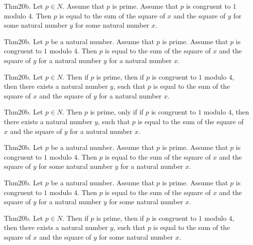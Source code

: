 \documentclass{article}
\begin{document}
Thm20b. Let $p \in N$. Assume that $p$ is prime. Assume that $p$ is congruent to $1$ modulo $4$. Then $p$ is equal to the sum of the square of $x$ and the square of $y$ for some natural number $y$ for some natural number $x$.

Thm20b. Let $p$ be a natural number. Assume that $p$ is prime. Assume that $p$ is congruent to $1$ modulo $4$. Then $p$ is equal to the sum of the square of $x$ and the square of $y$ for a natural number $y$ for a natural number $x$.

Thm20b. Let $p \in N$. Then if $p$ is prime, then if $p$ is congruent to $1$ modulo $4$, then there exists a natural number $y$, such that $p$ is equal to the sum of the square of $x$ and the square of $y$ for a natural number $x$.

Thm20b. Let $p \in N$. Then $p$ is prime, only if if $p$ is congruent to $1$ modulo $4$, then there exists a natural number $y$, such that $p$ is equal to the sum of the square of $x$ and the square of $y$ for a natural number $x$.

Thm20b. Let $p$ be a natural number. Assume that $p$ is prime. Assume that $p$ is congruent to $1$ modulo $4$. Then $p$ is equal to the sum of the square of $x$ and the square of $y$ for some natural number $y$ for a natural number $x$.

Thm20b. Let $p$ be a natural number. Assume that $p$ is prime. Assume that $p$ is congruent to $1$ modulo $4$. Then $p$ is equal to the sum of the square of $x$ and the square of $y$ for a natural number $y$ for some natural number $x$.

Thm20b. Let $p \in N$. Then if $p$ is prime, then if $p$ is congruent to $1$ modulo $4$, then there exists a natural number $y$, such that $p$ is equal to the sum of the square of $x$ and the square of $y$ for some natural number $x$.
\end{document}
